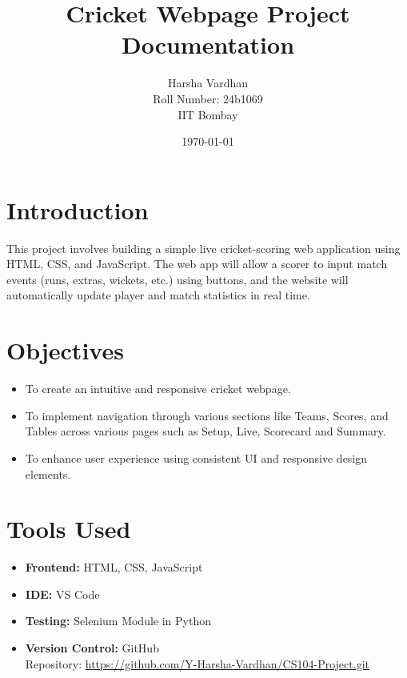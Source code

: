 \documentclass[a4paper,12pt]{article}
\title{\textbf{Cricket Webpage Project Documentation}}
\author{Harsha Vardhan \\
Roll Number: 24b1069 \\
IIT Bombay}
\date{\today}
\begin{document}
\maketitle
\tableofcontents
\newpage

\section{Introduction}
This project involves building a simple live cricket-scoring web application using HTML, CSS, and JavaScript. 
The web app will allow a scorer to input match events (runs, extras, wickets, etc.) using buttons,
and the website will automatically update player and match statistics in real time.

\section{Objectives}
\begin{itemize}
\item To create an intuitive and responsive cricket webpage.
\item To implement navigation through various sections like Teams, Scores, and Tables across various pages such as Setup, Live, Scorecard and Summary.
\item To enhance user experience using consistent UI and responsive design elements.
\end{itemize}

\section{Tools Used}
\begin{itemize}
\item \textbf{Frontend:} HTML, CSS, JavaScript
\item \textbf{IDE:} VS Code
\item \textbf{Testing:} Selenium Module in Python
\item \textbf{Version Control:} GitHub \\
 Repository: \url{https://github.com/Y-Harsha-Vardhan/CS104-Project.git}
\end{itemize}
\end{document}
